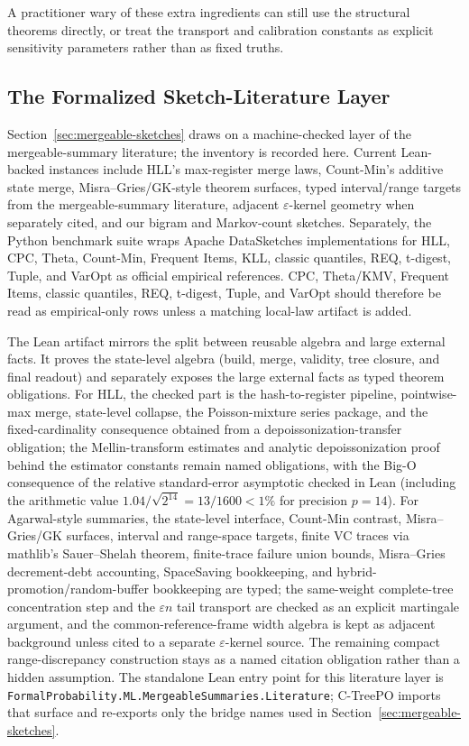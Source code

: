 A practitioner wary of these extra ingredients can still use the structural theorems directly, or treat the transport and calibration constants as explicit sensitivity parameters rather than as fixed truths.

\subsection{The Formalized Sketch-Literature Layer}\label{app:lean-literature-layer}

Section~\ref{sec:mergeable-sketches} draws on a machine-checked layer
of the mergeable-summary literature; the inventory is recorded here.
Current Lean-backed instances include HLL's max-register merge
laws, Count-Min's additive state merge, Misra--Gries/GK-style theorem surfaces,
typed interval/range targets from the mergeable-summary literature, adjacent
$\varepsilon$-kernel geometry when separately cited, and our bigram
and Markov-count sketches. Separately, the Python benchmark suite wraps
Apache DataSketches implementations for HLL, CPC, Theta, Count-Min,
Frequent Items, KLL, classic quantiles, REQ, t-digest, Tuple, and VarOpt
as official empirical references. CPC, Theta/KMV, Frequent Items, classic
quantiles, REQ, t-digest, Tuple, and VarOpt should therefore be read as
empirical-only rows unless a matching local-law artifact is added.

The Lean artifact mirrors the split between reusable algebra and large
external facts. It proves the
state-level algebra (build, merge, validity, tree closure, and final
readout) and separately exposes the large external facts as typed theorem
obligations. For HLL, the checked part is the hash-to-register pipeline,
pointwise-max merge, state-level collapse, the Poisson-mixture series package,
and the fixed-cardinality consequence obtained from a depoissonization-transfer
obligation; the Mellin-transform estimates and analytic depoissonization proof
behind the estimator constants remain named obligations, with the Big-O
consequence of the relative standard-error asymptotic checked in Lean
(including the arithmetic value $1.04/\sqrt{2^{14}}=13/1600<1\%$ for
precision $p=14$). For
Agarwal-style summaries, the
state-level interface, Count-Min contrast, Misra--Gries/GK surfaces, interval
and range-space targets, finite VC traces via mathlib's
Sauer--Shelah theorem, finite-trace failure union bounds,
Misra--Gries decrement-debt accounting, SpaceSaving bookkeeping, and
hybrid-promotion/random-buffer bookkeeping are typed; the
same-weight complete-tree concentration step and the $\varepsilon n$ tail
transport are checked as an explicit martingale argument, and the
common-reference-frame width algebra is kept as adjacent background unless
cited to a separate $\varepsilon$-kernel source. The remaining compact
range-discrepancy construction stays as a named citation obligation rather
than a hidden assumption. The standalone Lean entry point for
this literature layer is
\texttt{FormalProbability.ML.MergeableSummaries.Literature}; C-TreePO imports
that surface and re-exports only the bridge names used in
Section~\ref{sec:mergeable-sketches}.

